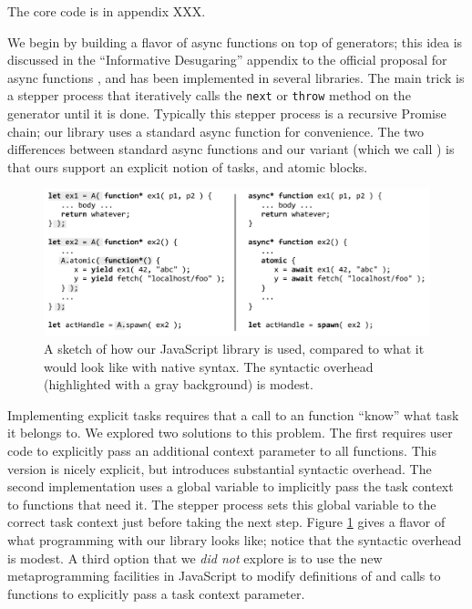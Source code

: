 \documentclass[acmsmall,anonymous,review]{acmart}\settopmatter{printfolios=true,printccs=false,printacmref=false}
\begin{document}
The core code is in appendix XXX.

We begin by building a flavor of async functions on top of generators; this idea is discussed in the ``Informative Desugaring'' appendix to the official proposal for async functions \cite{Terlson2016}, and has been implemented in several libraries.
The main trick is a stepper process that iteratively calls the \texttt{next} or \texttt{throw} method on the generator until it is done.
Typically this stepper process is a recursive Promise chain; our library uses a standard async function for convenience.
The two differences between standard async functions and our variant (which we call \emph{\asyncs{}}) is that ours support an explicit notion of tasks, and atomic blocks.

\begin{figure}
\includegraphics[scale=0.75]{Code/trivial_js}
\caption{A sketch of how our JavaScript library is used, compared to what it would look like with native syntax.
  The syntactic overhead (highlighted with a gray background) is modest.}
\label{fig:trivial_js}
\end{figure}

Implementing explicit tasks requires that a call to an \asyncs{} function ``know'' what task it belongs to.
We explored two solutions to this problem.
The first requires user code to explicitly pass an additional context parameter to all \asyncs{} functions.
This version is nicely explicit, but introduces substantial syntactic overhead.
The second implementation uses a global variable to implicitly pass the task context to functions that need it.
The stepper process sets this global variable to the correct task context just before taking the next step.
Figure \ref{fig:trivial_js} gives a flavor of what programming with our library looks like; notice that the syntactic overhead is modest.
A third option that we \emph{did not} explore is to use the new metaprogramming facilities in JavaScript to modify definitions of and calls to \asyncs{} functions to explicitly pass a task context parameter.
\end{document}
